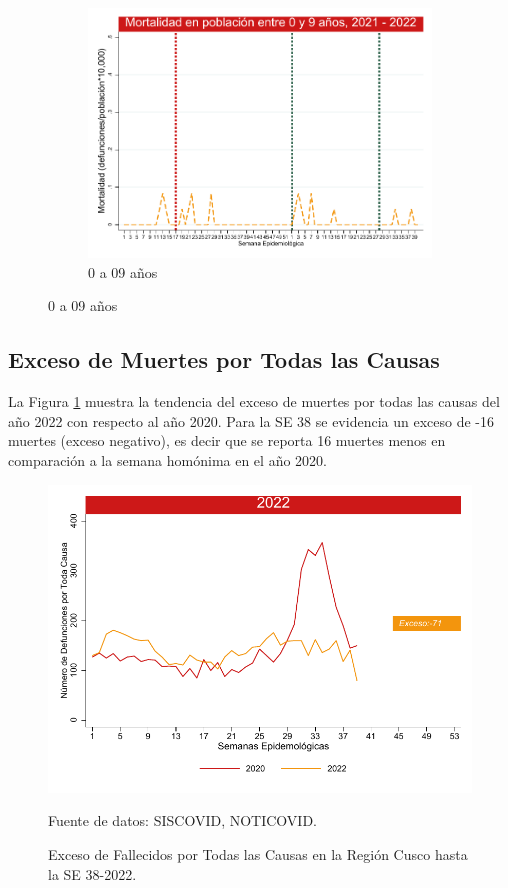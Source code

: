 \documentclass[12pt,a4paper,openany]{book}
\begin{document}
\begin{figure}[h]
		\vspace{10mm}
		\begin{subfigure}[b]{0.45\textwidth}
			\centering
			\includegraphics[width=\textwidth]{../figuras/mortalidad_edad_0.pdf}
			\caption{0 a 09 años}
		\end{subfigure}
	\end{figure}
	\clearpage	
	\subsection*{Exceso de Muertes por Todas las Causas}
	\noindent La Figura \ref{fig:exceso_regional} muestra la tendencia del exceso de muertes por todas las causas del año 2022 con respecto al año 2020.  Para la SE 38 se evidencia un exceso de -16 muertes (exceso negativo), es
	decir que se reporta 16 muertes menos en comparación a la semana homónima en el año 2020.
	
	
	
	\begin{figure}[h]
		\caption{Exceso de Fallecidos por Todas las Causas en la Región Cusco hasta la SE 38-2022.}\label{fig:exceso_regional}
		\begin{center}
			\includegraphics[width=0.85\linewidth]{../figuras/exceso_region_2022.pdf}
		\end{center}
		{\footnotesize {Fuente de datos: SISCOVID, NOTICOVID.}}
	\end{figure}
	\clearpage
	
\end{document}
